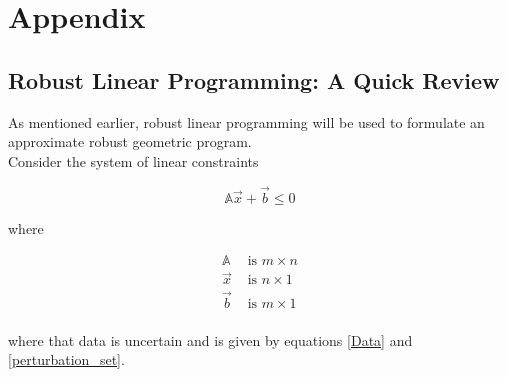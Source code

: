\section*{Appendix}

\subsection{Robust Linear Programming: A Quick Review} \label{LP_to_GP}

As mentioned earlier, robust linear programming will be used to formulate an approximate robust geometric program.\\[12pt]
Consider the system of linear constraints

\begin{equation*}
    \mathbb{A}\vec{x} + \vec{b} \leq 0
\end{equation*}

where

\begin{equation*}
\begin{aligned}
\mathbb{A} &\text{ is $m \times n$}\\
\vec{x} &\text{ is $n \times 1$}\\
\vec{b} &\text{ is $m \times 1$}\\
\end{aligned}
\end{equation*}

where that data is uncertain and is given by equations \eqref{Data} and \eqref{perturbation_set}.

